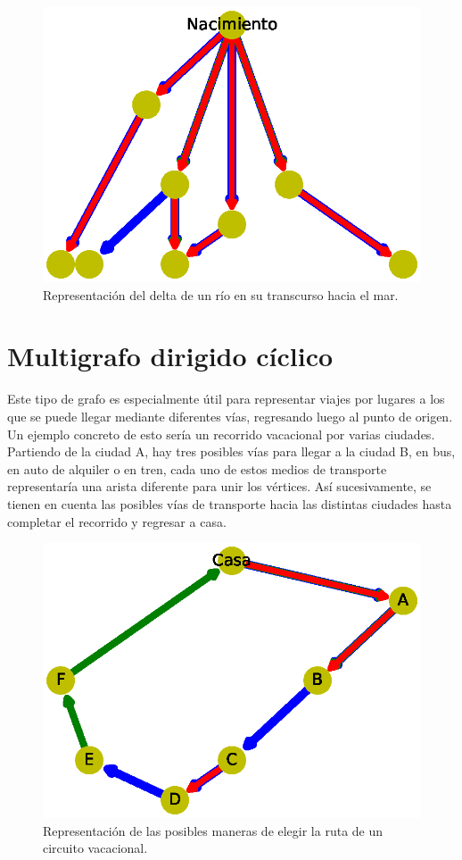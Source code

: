 \documentclass{article}
\begin{document}

\begin{figure}
  \includegraphics[width=.8\columnwidth]{10.eps}
  \caption{Representación del delta de un río en su transcurso hacia el mar.}
  \label{fig:10}
\end{figure}

\section{Multigrafo dirigido cíclico}

Este tipo de grafo es especialmente útil para representar viajes por lugares a los que se puede llegar mediante diferentes vías, regresando luego al punto de origen. Un ejemplo concreto de esto sería un recorrido vacacional por varias ciudades. Partiendo de la ciudad A, hay tres posibles vías  para llegar a la ciudad B, en bus, en auto de alquiler o en tren, cada uno de estos medios de transporte representaría una arista diferente para unir los vértices. Así sucesivamente, se tienen en cuenta las posibles vías de transporte hacia las distintas ciudades hasta completar el recorrido y regresar a casa. 



\begin{figure}
  \includegraphics[width=.8\columnwidth]{11.eps}
  \caption{Representación de las posibles maneras de elegir la ruta de un circuito vacacional.}
  \label{fig:11}
\end{figure}
\end{document}
